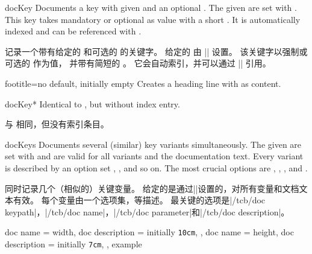 \begin{docEnvironment}[doclang/environment content=key description,doc updated=2020-04-22]
  {docKey}{}
Documents a key with given  and an optional .
The given  are set with .
This key takes mandatory or optional  as value
with a short .
It is automatically indexed and can be referenced with
.

记录一个带有给定的  和可选的  的关键字。 给定的  由 |\tcbset| 设置。 该关键字以强制或可选的  作为值， 并带有简短的 。 它会自动索引，并可以通过 || 引用。
\begin{dispExample}
\begin{docKey}[foo]{footitle}{=}{no default, initially empty}
Creates a heading line with  as content.
\end{docKey}
\end{dispExample}
\end{docEnvironment}


\begin{docEnvironment}[doclang/environment content=key description,doc updated=2020-04-22]
  {docKey*}{}
Identical to , but without index entry.

与  相同，但没有索引条目。
\end{docEnvironment}

\begin{docEnvironment}[doclang/environment content=key description,doc new=2020-04-22]
  {docKeys}{}
Documents several (similar) key variants simultaneously.
The given  are set with  and are valid for
all variants and the documentation text.
Every variant is described by an option set , , and so on.
The most crucial options are
, , ,
and .

同时记录几个（相似的）关键变量。 给定的是通过|\tcbset|设置的，对所有变量和文档文本有效。 每个变量由一个选项集，等描述。 最关键的选项是|/tcb/doc keypath|，|/tcb/doc name|，|/tcb/doc parameter|和|/tcb/doc description|。
\begin{dispExample}
\begin{docKeys}[
  doc no index,   %
  doc keypath   = mykeyroot,
  doc parameter = {=\meta{length}},
]
{
  {
    doc name        = width,
    doc description = initially \texttt{10cm},
  },
  {
    doc name        = height,
    doc description = initially \texttt{7cm},
  },
}
example
\end{docKeys}
\end{dispExample}
\end{docEnvironment}


